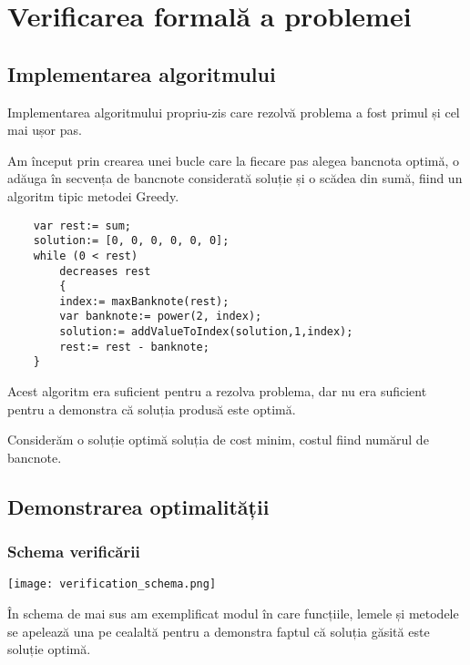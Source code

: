 
\chapter{Verificarea formală a problemei}

\section{Implementarea algoritmului}
    Implementarea algoritmului propriu-zis care rezolvă problema a fost primul și cel mai ușor pas.\par
    Am început prin crearea unei bucle care la fiecare pas alegea bancnota optimă, o adăuga în secvența de 
    bancnote considerată soluție și o scădea din sumă, fiind un algoritm tipic metodei Greedy.
    \begin{lstlisting}
    var rest:= sum;
    solution:= [0, 0, 0, 0, 0, 0];
    while (0 < rest)
        decreases rest 
        {
        index:= maxBanknote(rest);
        var banknote:= power(2, index);
        solution:= addValueToIndex(solution,1,index);
        rest:= rest - banknote;
    }
    \end{lstlisting}

    Acest algoritm era suficient pentru a rezolva problema, dar nu era suficient pentru a demonstra că soluția produsă este optimă.\par
    Considerăm o soluție optimă soluția de cost minim, costul fiind numărul de bancnote.
    
\section{Demonstrarea optimalității}
    \subsection{Schema verificării}
    \vspace{1cm}
    \begin{center}
        \texttt{[image: verification\_schema.png]}\par
    \end{center}
    În schema de mai sus am exemplificat modul în care funcțiile, lemele și metodele se apelează una pe cealaltă pentru a demonstra faptul că soluția găsită este soluție optimă.\par

